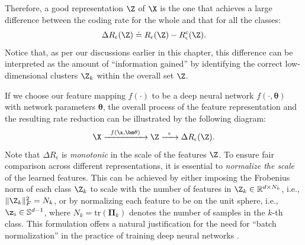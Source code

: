 \documentclass[../../book-main.tex]{subfiles}
\begin{document}

Therefore, a good representation $\Z$ of $\X$ is the one that achieves a large difference between the coding rate for the whole and that for all the classes:
\begin{equation}
	\Delta R_{\epsilon}(\Z) \doteq R_{\epsilon}(\Z) - R_{\epsilon}^c(\Z).
	\label{chap4-eqn:coding-length-reduction}
\end{equation}
Notice that, as per our discussions earlier in this chapter, this difference can be interpreted as the amount of ``information gained'' by identifying the correct low-dimensional clusters $\Z_k$ within the overall set $\Z$.

If we choose our feature mapping $f(\cdot)$ to be a deep neural network $f(\cdot,\bm \theta)$ with network parameters $\bm \theta$, the overall process of the feature representation and the resulting rate reduction  can be illustrated by the following diagram:
\begin{equation}
	\X
	\xrightarrow{\hspace{2mm} f(\x, \bm \theta)\hspace{2mm}} \Z  \xrightarrow{\hspace{2mm} \epsilon \hspace{2mm}} \Delta R_{\epsilon}(\Z).
	\label{chap4-eqn:flow}
\end{equation}
Note that $\Delta R_{\epsilon}$ is {\em monotonic} in the scale of the features $\Z$. To ensure fair comparison across different representations, it is essential to {\em normalize the scale} of the learned features. This can be achieved by either imposing the Frobenius norm of each class $\Z_k$ to scale with the number of features in $\Z_k \in \mathbb R^{d \times N_k}$, i.e., $\|\Z_k\|_F^2 = N_k$, or by normalizing each feature to be on the unit sphere, i.e., $\z_i \in \mathbb{S}^{d-1}$, where $N_k=\mathrm{tr}(\bm \Pi_k)$ denotes the number of samples in the $k$-th class. This formulation offers a natural justification for the need for ``batch normalization'' in the practice of
training deep neural networks \cite{ioffe2015batch}. %
\end{document}
